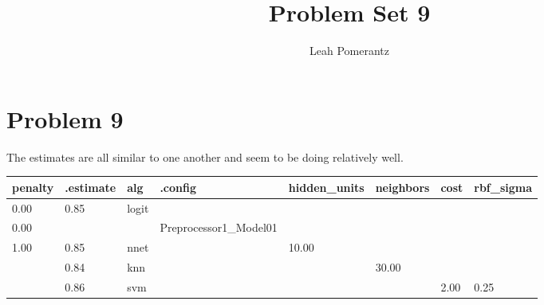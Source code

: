 \documentclass{article}
\title{Problem Set 9}
\author{Leah Pomerantz}
\begin{document}
\maketitle

\section{Problem 9}

The estimates are all similar to one another and seem to be doing relatively well.

\begin{table}
\centering
\begin{tabular}[t]{llllllll}
\toprule
penalty & .estimate & alg & .config & hidden\_units & neighbors & cost & rbf\_sigma\\
\midrule
0.00 & 0.85 & logit &  &  &  &  & \\
0.00 &  &  & Preprocessor1\_Model01 &  &  &  & \\
1.00 & 0.85 & nnet &  & 10.00 &  &  & \\
 & 0.84 & knn &  &  & 30.00 &  & \\
 & 0.86 & svm &  &  &  & 2.00 & 0.25\\
\bottomrule
\end{tabular}
\end{table}
\end{document}
